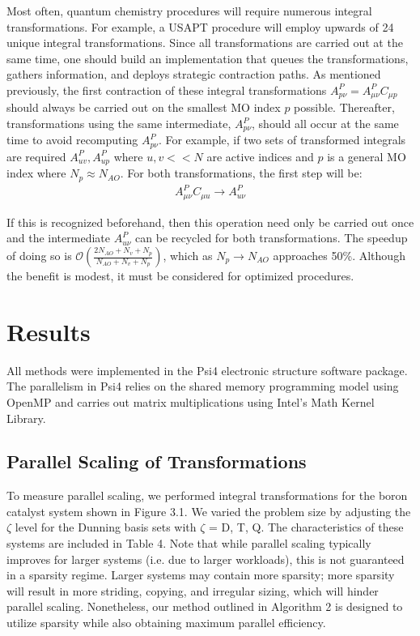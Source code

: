 Most often, quantum chemistry procedures will require numerous integral transformations. For example, a USAPT procedure will employ
upwards of 24 unique integral transformations. Since all transformations are carried out at the same time, one should build an 
implementation that queues the transformations, gathers information, and deploys strategic contraction paths.
As mentioned previously, the first contraction of these integral transformations $A_{p \nu}^P=A_{\mu \nu}^PC_{\mu p}$ 
should always be carried out on the smallest MO index $p$ 
possible. Thereafter, transformations using the same intermediate, $A_{p \nu}^P$, should all occur at the same time to avoid
recomputing $A_{p \nu}^P$. 
For example, if two sets of transformed integrals are required $A^P_{u v}, A^P_{up}$ where $u,v << N$ are active 
indices and $p$ is a general MO index where $N_p \approx N_{AO}$. For both transformations, the first step will be:
\begin{align} 
A^P_{\mu \nu}C_{\mu u} \rightarrow A^P_{u \nu} 
\end{align}

\noindent If this is recognized beforehand, then this operation need only be carried out once and 
the intermediate $A^P_{u \nu}$ can be recycled
for both transformations. The speedup of doing so is $\mathcal{O}(\frac{2N_{AO} + N_v + N_p}{N_{AO} + N_v + N_p})$, 
which as $N_p \rightarrow N_{AO}$ approaches
50\%. Although the benefit is modest, it must be considered for optimized procedures.

\section{Results}

All methods were implemented in the {\sc Psi4} electronic structure software package.
The parallelism in {\sc Psi4} relies on the shared memory programming model using OpenMP 
and carries out matrix multiplications using Intel's Math Kernel
Library. 


\subsection{Parallel Scaling of Transformations}

To measure parallel scaling, we performed integral transformations for the boron catalyst system shown in Figure 3.1. 
We varied the problem size by adjusting the $\zeta$ level for the Dunning basis sets with $\zeta$ = D, T, Q.
The characteristics of these systems are included in Table 4. Note that while parallel scaling typically improves
for larger systems (i.e. due to larger workloads),
this is not guaranteed in a sparsity regime. Larger systems may contain more sparsity;
more sparsity will result in more striding, copying, and irregular sizing,
which will hinder parallel scaling. Nonetheless, our method outlined in Algorithm 2 is designed to utilize sparsity while also
obtaining maximum parallel efficiency. 

